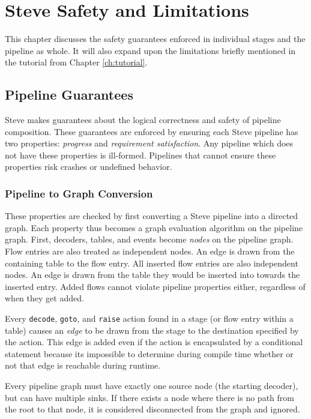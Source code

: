 \chapter{Steve Safety and Limitations} \label{ch:limits}

This chapter discusses the safety guarantees enforced in individual stages
and the pipeline as whole. It will also expand upon the limitations
briefly mentioned in the tutorial from Chapter \ref{ch:tutorial}.

\section{Pipeline Guarantees} \label{guide:pipeline_checking}

Steve makes guarantees about the logical correctness and safety of pipeline 
composition. These guarantees are enforced by ensuring each Steve pipeline has two  properties: \textit{progress} and \textit{requirement satisfaction}. Any 
pipeline which does not have these properties is ill-formed. 
Pipelines that cannot ensure these properties risk crashes or undefined behavior.

\subsection{Pipeline to Graph Conversion} \label{guide:pipeline_graph}

These properties are checked by first converting a Steve pipeline into a directed graph. Each property thus becomes a graph evaluation algorithm on the pipeline graph. 
First, decoders, tables, and events become \textit{nodes} on the pipeline graph.
Flow entries are also treated as independent nodes. 
An edge is drawn from the containing table to the flow entry. 
All inserted flow entries are also independent nodes.
An edge is drawn from the table they would be inserted into towards the inserted
entry.
Added flows cannot violate pipeline properties either, regardless of when they get 
added.

Every \texttt{decode}, \texttt{goto}, and \texttt{raise} action found in a stage 
(or flow entry within a table) causes an \textit{edge} to be drawn from the stage 
to the destination specified by the action. 
This edge is added even if the action is encapsulated by a conditional statement 
because its impossible to determine during compile time whether or not that edge 
is reachable during runtime.

Every pipeline graph must have exactly one source node (the starting decoder), but can have multiple sinks.
If there exists a node where there is no path from the root to that node, it is
considered disconnected from the graph and ignored.

